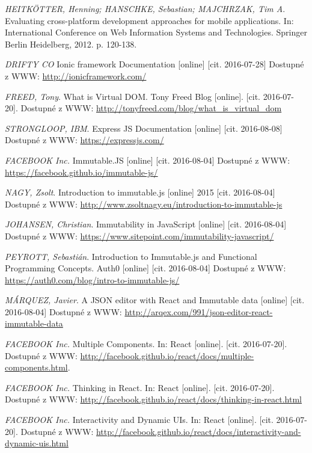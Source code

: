 \begin{thebibliography}{10}
 \textit{HEITKÖTTER, Henning; HANSCHKE, Sebastian; MAJCHRZAK, Tim A}. Evaluating cross-platform development approaches for mobile applications. In: International Conference on Web Information Systems and Technologies. Springer Berlin Heidelberg, 2012. p. 120-138.

 \textit{DRIFTY CO} Ionic framework Documentation [online] [cit. 2016-07-28] Dostupné z WWW: \url{http://ionicframework.com/}
 
 \textit{FREED, Tony}. What is Virtual DOM. Tony Freed Blog [online]. [cit. 2016-07- 20]. Dostupné z WWW: \url{http://tonyfreed.com/blog/what_is_virtual_dom}

 \textit{STRONGLOOP, IBM}. Express JS Documentation [online] [cit. 2016-08-08] Dostupné z WWW: \url{https://expressjs.com/}

 \textit{FACEBOOK Inc.} Immutable.JS [online] [cit. 2016-08-04] Dostupné z WWW: \url{https://facebook.github.io/immutable-js/}

 \textit{NAGY, Zsolt}. Introduction to immutable.js [online] 2015 [cit. 2016-08-04] Dostupné z WWW: \url{http://www.zsoltnagy.eu/introduction-to-immutable-js}

 \textit{JOHANSEN, Christian}. Immutability in JavaScript [online] [cit. 2016-08-04] Dostupné z WWW: \url{https://www.sitepoint.com/immutability-javascript/}

 \textit{PEYROTT, Sebastián}. Introduction to Immutable.js and Functional Programming Concepts. Auth0 [online] [cit. 2016-08-04] Dostupné z WWW: \url{https://auth0.com/blog/intro-to-immutable-js/}

 \textit{MÁRQUEZ, Javier}. A JSON editor with React and Immutable data [online] [cit. 2016-08-04] Dostupné z WWW: \url{http://arqex.com/991/json-editor-react-immutable-data}

 \textit{FACEBOOK Inc.} Multiple Components. In: React [online]. [cit. 2016-07-20]. Dostupné z WWW: \url{http://facebook.github.io/react/docs/multiple-components.html}.

 \textit{FACEBOOK Inc.} Thinking in React. In: React [online]. [cit. 2016-07-20]. Dostupné z WWW: \url{http://facebook.github.io/react/docs/thinking-in-react.html}

 \textit{FACEBOOK Inc.} Interactivity and Dynamic UIs. In: React [online]. [cit. 2016-07-20]. Dostupné z WWW: \url{http://facebook.github.io/react/docs/interactivity-and-dynamic-uis.html}


\end{thebibliography}
